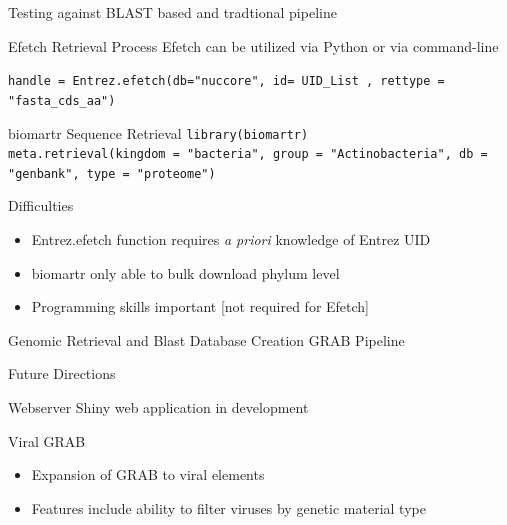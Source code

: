 \documentclass[11pt]{beamer}
\begin{document}
	
	\begin{frame}{Testing against BLAST based and tradtional pipeline}
	
	\begin{block}{Efetch Retrieval Process}
	Efetch can be utilized via Python or via command-line
	
	\texttt{handle = Entrez.efetch(db="nuccore", id= \alert{UID\_List} , rettype = "fasta\_cds\_aa")}
	
	\end{block}
	
	\begin{block}{biomartr Sequence Retrieval}
	\texttt{library(biomartr) \\
	meta.retrieval(kingdom = "bacteria", \alert{group = "Actinobacteria"}, db = "genbank", type = "proteome")}
	\end{block}
	
	\begin{block}{Difficulties}
	\begin{itemize}
	\item Entrez.efetch function requires \textit{a priori} knowledge of Entrez UID 
	\item biomartr only able to bulk download phylum level
	\item Programming skills important [not required for Efetch]
	\end{itemize}
	\end{block}
	
	\end{frame}
	
	
	\begin{frame}{Genomic Retrieval and Blast Database Creation}
	\center
	GRAB Pipeline
	
	
	\end{frame}
	\begin{frame}{Future Directions}
	\begin{block}{Webserver}
	Shiny web application in development
	\end{block}
	
	\begin{block}{Viral GRAB}
	\begin{itemize}
	\item Expansion of GRAB to viral elements
	\item Features include ability to filter viruses by genetic material type
	\end{itemize}
	\end{block}
	\end{frame}
	
\end{document}
